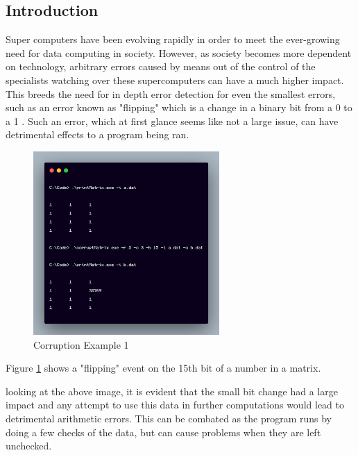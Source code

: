 \documentclass{article}
\begin{document}
    \tableofcontents
    \thispagestyle{empty}

    \newpage
    \setcounter{page}{1}

    \begin{multicols}{2}
    \section{Introduction}\label{sec:intro}
    Super computers have been evolving rapidly in order to meet the ever-growing need for data computing
    in society. However, as society becomes more dependent on technology, arbitrary errors caused by means
    out of the control of the specialists watching over these supercomputers can have a much higher impact.
    This breeds the need for in depth error detection for even the smallest errors, such as an error known
    as "flipping" which is a change in a binary bit from a 0 to a 1 \cite{basgall}. Such an error, which at first glance seems like not a large issue, can have detrimental effects to a
    program being ran.

    \begin{figure}[H]
        \centering
        \includegraphics[height=2.75in]{./media/intro1.PNG}
        \caption[Corruption Example 1]{Corruption Example 1}
        \label{fig:CE1}
    \end{figure}

    Figure \ref{fig:CE1} shows a "flipping" event on the 15th bit of a number in a matrix.
    \vspace {4mm}
    
    
    looking at the above image, it is evident that the small bit change had a large impact and any attempt
    to use this data in further computations would lead to detrimental arithmetic errors. This can be combated
    as the program runs by doing a few checks of the data, but can cause problems when they are left unchecked.

\end{multicols}
\end{document}
